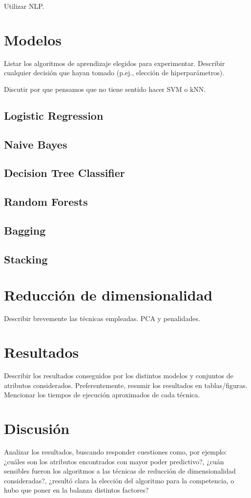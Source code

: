 \documentclass[10pt,a4paper]{article}
\begin{document}
Utilizar NLP.

\section{Modelos}

Listar los algoritmos de aprendizaje elegidos para experimentar. Describir cualquier decisión que hayan tomado (p.ej., elección de hiperparámetros).

Discutir por que pensamos que no tiene sentido hacer SVM o kNN.

\subsection{Logistic Regression}
\subsection{Naive Bayes}
\subsection{Decision Tree Classifier}
\subsection{Random Forests}
\subsection{Bagging}
\subsection{Stacking}

\section{Reducción de dimensionalidad}

Describir brevemente las técnicas empleadas. PCA y penalidades.

\section{Resultados}
Describir los resultados conseguidos por los distintos modelos y conjuntos de atributos considerados. Preferentemente, resumir los resultados en tablas/figuras. Mencionar los tiempos de ejecución aproximados de cada técnica.


\section{Discusión}

Analizar los resultados, buscando responder cuestiones como, por ejemplo: ¿cuáles son los atributos encontrados con mayor poder predictivo?, ¿cuán sensibles fueron los algoritmos a las técnicas de reducción de dimensionalidad consideradas?, ¿resultó clara la elección del algoritmo para la competencia, o hubo que poner en la balanza distintos factores?
\end{document}
